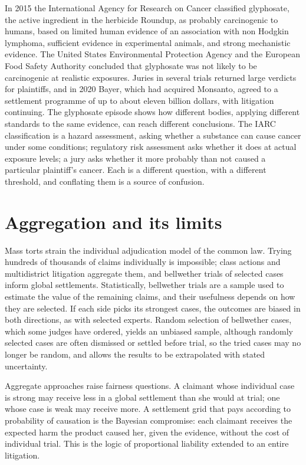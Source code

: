 In 2015 the International Agency for Research on Cancer classified glyphosate, the active ingredient in the herbicide Roundup, as probably carcinogenic to humans, based on limited human evidence of an association with non Hodgkin lymphoma, sufficient evidence in experimental animals, and strong mechanistic evidence. The United States Environmental Protection Agency and the European Food Safety Authority concluded that glyphosate was not likely to be carcinogenic at realistic exposures. Juries in several trials returned large verdicts for plaintiffs, and in 2020 Bayer, which had acquired Monsanto, agreed to a settlement programme of up to about eleven billion dollars, with litigation continuing. The glyphosate episode shows how different bodies, applying different standards to the same evidence, can reach different conclusions. The IARC classification is a hazard assessment, asking whether a substance can cause cancer under some conditions; regulatory risk assessment asks whether it does at actual exposure levels; a jury asks whether it more probably than not caused a particular plaintiff's cancer. Each is a different question, with a different threshold, and conflating them is a source of confusion.

\section{Aggregation and its limits}

Mass torts strain the individual adjudication model of the common law. Trying hundreds of thousands of claims individually is impossible; class actions and multidistrict litigation aggregate them, and bellwether trials of selected cases inform global settlements. Statistically, bellwether trials are a sample used to estimate the value of the remaining claims, and their usefulness depends on how they are selected. If each side picks its strongest cases, the outcomes are biased in both directions, as with selected experts. Random selection of bellwether cases, which some judges have ordered, yields an unbiased sample, although randomly selected cases are often dismissed or settled before trial, so the tried cases may no longer be random, and allows the results to be extrapolated with stated uncertainty.

Aggregate approaches raise fairness questions. A claimant whose individual case is strong may receive less in a global settlement than she would at trial; one whose case is weak may receive more. A settlement grid that pays according to probability of causation is the Bayesian compromise: each claimant receives the expected harm the product caused her, given the evidence, without the cost of individual trial. This is the logic of proportional liability extended to an entire litigation.

